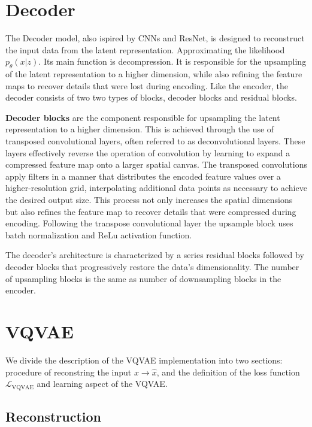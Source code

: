 \section{Decoder}
The Decoder model, also ispired by CNNs and ResNet, is designed to reconstruct the input data from the latent representation. Approximating the likelihood $p_\theta(x|z)$.
Its main function is decompression. It is responsible for the upsampling of the latent representation to a higher dimension, while also refining the feature maps to recover details that were lost during encoding.
Like the encoder, the decoder consists of two two types of blocks, decoder blocks and residual blocks.


\textbf{Decoder blocks} are the component responsible for upsampling the latent representation to a higher dimension. This is achieved through the use of transposed convolutional layers, often referred to as deconvolutional layers. These layers effectively reverse the operation of convolution by learning to expand a compressed feature map onto a larger spatial canvas.
The transposed convolutions apply filters in a manner that distributes the encoded feature values over a higher-resolution grid, interpolating additional data points as necessary to achieve the desired output size.
This process not only increases the spatial dimensions but also refines the feature map to recover details that were compressed during encoding.
Following the transpose convolutional layer the upsample block uses batch normalization and ReLu activation function.

The decoder's architecture is characterized by a series residual blocks followed by decoder blocks that progressively restore the data's dimensionality. The number of upsampling blocks is the same as number of downsampling blocks in the encoder. 


\section{VQVAE}

We divide the description of the VQVAE implementation into two sections: procedure of reconstring the input $x \rightarrow \hat{x}$, and the definition of the loss function $\mathcal{L}_\text{VQVAE}$ and learning aspect of the VQVAE. 

\subsection{Reconstruction}

